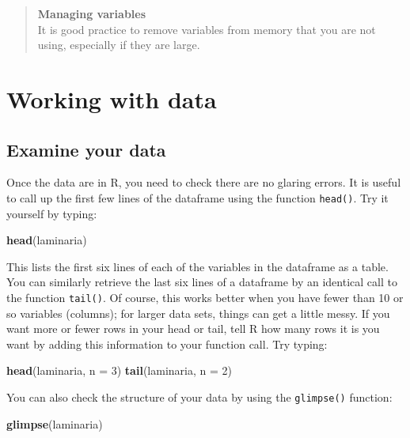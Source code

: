 \documentclass[]{book}
\newenvironment{Shaded}{\begin{snugshade}}{\end{snugshade}}
\newcommand{\KeywordTok}[1]{\textcolor[rgb]{0.13,0.29,0.53}{\textbf{#1}}}
\newcommand{\DataTypeTok}[1]{\textcolor[rgb]{0.13,0.29,0.53}{#1}}
\newcommand{\DecValTok}[1]{\textcolor[rgb]{0.00,0.00,0.81}{#1}}
\newcommand{\NormalTok}[1]{#1}
\theoremstyle{definition}
\theoremstyle{definition}
\theoremstyle{definition}
\theoremstyle{remark}
\begin{document}
\begin{quote}
\textbf{Managing variables}\\
It is good practice to remove variables from memory that you are not
using, especially if they are large.
\end{quote}

\section{Working with data}\label{working-with-data}

\subsection{Examine your data}\label{examine-your-data}

Once the data are in R, you need to check there are no glaring errors.
It is useful to call up the first few lines of the dataframe using the
function \texttt{head()}. Try it yourself by typing:

\begin{Shaded}
\begin{Highlighting}[]
\KeywordTok{head}\NormalTok{(laminaria)}
\end{Highlighting}
\end{Shaded}

This lists the first six lines of each of the variables in the dataframe
as a table. You can similarly retrieve the last six lines of a dataframe
by an identical call to the function \texttt{tail()}. Of course, this
works better when you have fewer than 10 or so variables (columns); for
larger data sets, things can get a little messy. If you want more or
fewer rows in your head or tail, tell R how many rows it is you want by
adding this information to your function call. Try typing:

\begin{Shaded}
\begin{Highlighting}[]
\KeywordTok{head}\NormalTok{(laminaria, }\DataTypeTok{n =} \DecValTok{3}\NormalTok{)}
\KeywordTok{tail}\NormalTok{(laminaria, }\DataTypeTok{n =} \DecValTok{2}\NormalTok{)}
\end{Highlighting}
\end{Shaded}

You can also check the structure of your data by using the
\texttt{glimpse()} function:

\begin{Shaded}
\begin{Highlighting}[]
\KeywordTok{glimpse}\NormalTok{(laminaria)}
\end{Highlighting}
\end{Shaded}
\end{document}
